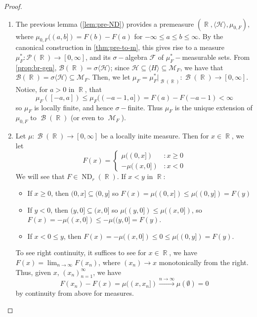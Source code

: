 \documentclass[11pt, a4paper]{memoir}
\DeclareMathOperator{\R}{{\mathbb{R}}}
\newcommand{\fto}[1]{\ensuremath{\xrightarrow{\scriptstyle{#1}}}}
\theoremstyle{change}
\theoremstyle{plain}
\theoremstyle{nonumberplain}
\newtheorem{proof}{Proof}
\DeclareMathOperator{\M}{{\mathcal{M}}}
\DeclareMathOperator{\B}{{\mathcal{B}}}
\DeclareMathOperator{\ND}{ND}
\numberwithin{equation}{section}
\begin{document}
\begin{proof}
    \begin{enumerate}[r]
        \item The previous lemma (\cref{lem:pre-ND}) provides a premeasure $(\R,\langle\mathcal{H}\rangle,\mu_{0,F})$, where $\mu_{0,F}((a,b])=F(b)-F(a)$ for $-\infty\leq a\leq b\leq\infty$. %
            By the canonical construction in \cref{thm:pre-to-m}, this gives rise to a measure $\mu_F^*:\mathcal{P}(\R)\to[0,\infty]$, and its $\sigma-$algebra $\mathcal{F}$ of $\mu_F^*-$measurable sets.
            From \cref{prop:br-gen}, $\mathcal{B}(\R)=\sigma\langle\mathcal{H}\rangle$; since $\mathcal{H}\subseteq \langle H\rangle\subseteq\mathcal{M}_F$, we have that $\mathcal{B}(\R)=\sigma\langle\mathcal{H}\rangle\subseteq\mathcal{M}_F$.
            Then, we let $\mu_F=\mu^*_F|_{\B(\R)}:\B(\R)\to[0,\infty]$.
            Notice, for $a>0$ in $\R$, that
            \begin{equation*}
                \mu_F([-a,a])\leq \mu_F((-a-1,a])=F(a)-F(-a-1)<\infty
            \end{equation*}
            so $\mu_F$ is locally finite, and hence $\sigma-$finite.
            Thus $\mu_F$ is the unique extension of $\mu_{0,F}$ to $\B(\R)$ (or even to $\M_F$).
        \item Let $\mu:\B(\R)\to[0,\infty]$ be a locally inite measure.
            Then for $x\in\R$, we let
            \begin{equation*}
                F(x)=\begin{cases}\mu((0,x])&:x\geq 0\\-\mu((x,0])&:x<0\end{cases}
            \end{equation*}
            We will see that $F\in\ND_r(\R)$.
            If $x<y$ in $\R$:
            \begin{itemize}[nolistsep]
                \item If $x\geq 0$, then $(0,x]\subseteq(0,y]$ so $F(x)=\mu((0,x])\leq\mu((0,y])=F(y)$
                \item If $y<0$, then $(y,0]\subseteq(x,0]$ so $\mu((y,0])\leq\mu((x,0])$, so $F(x)=-\mu((x,0])\leq -\mu((y,0]=F(y)$.
                \item If $x<0\leq y$, then $F(x)=-\mu((x,0])\leq 0\leq \mu((0,y])=F(y)$.
            \end{itemize}
            To see right continuity, it suffices to see for $x\in\R$, we have $F(x)=\lim_{n\to\infty} F(x_n)$, where $(x_n)\to x$ monotonically from the right.
            Thus, given $x$, $(x_n)_{n=1}^\infty$, we have
            \begin{equation*}
                F(x_n)-F(x)=\mu((x,x_n])\fto{n\to\infty}\mu(\emptyset)=0 %
            \end{equation*}
            by continuity from above for measures.


\end{enumerate}
\end{proof}
\end{document}
